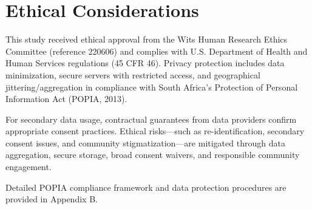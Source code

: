 \section{Ethical Considerations}

This study received ethical approval from the Wits Human Research Ethics Committee (reference 220606) and complies with U.S. Department of Health and Human Services regulations (45 CFR 46). Privacy protection includes data minimization, secure servers with restricted access, and geographical jittering/aggregation in compliance with South Africa's Protection of Personal Information Act (POPIA, 2013).

For secondary data usage, contractual guarantees from data providers confirm appropriate consent practices. Ethical risks—such as re-identification, secondary consent issues, and community stigmatization—are mitigated through data aggregation, secure storage, broad consent waivers, and responsible community engagement.

Detailed POPIA compliance framework and data protection procedures are provided in Appendix B.